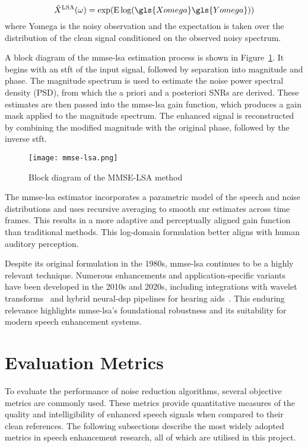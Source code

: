 \begin{equation}
    \hat{X}^{\text{LSA}}(\omega) =\exp (\mathrm{E} \log(\gls{Xomega} \gls{Yomega}))
\end{equation}
where \gls{Yomega} is the noisy observation and the expectation is taken over the distribution of the clean signal conditioned on the observed noisy spectrum.

A block diagram of the \gls{mmse-lsa} estimation process is shown in Figure~\ref{fig:mmse_lsa_block}. It begins with an \gls{stft} of the input signal, followed by separation into magnitude and phase. The magnitude spectrum is used to estimate the noise power spectral density (PSD), from which the a priori and a posteriori SNRs are derived. These estimates are then passed into the \gls{mmse-lsa} gain function, which produces a gain mask applied to the magnitude spectrum. The enhanced signal is reconstructed by combining the modified magnitude with the original phase, followed by the inverse \gls{stft}.

\begin{figure}[H]
    \centering
    \texttt{[image: mmse-lsa.png]}
    \caption{\label{fig:mmse_lsa_block} Block diagram of the MMSE-LSA method}
\end{figure}

The \gls{mmse-lsa} estimator incorporates a parametric model of the speech and noise distributions and uses recursive averaging to smooth \gls{snr} estimates across time frames. This results in a more adaptive and perceptually aligned gain function than traditional methods. This log-domain formulation better aligns with human auditory perception.

Despite its original formulation in the 1980s, \gls{mmse-lsa} continues to be a highly relevant technique. Numerous enhancements and application-specific variants have been developed in the 2010s and 2020s, including integrations with wavelet transforms~\cite{wei2016mmse} and hybrid neural-\gls{dsp} pipelines for hearing aids~\cite{sugahara2024hybrid}. This enduring relevance highlights \gls{mmse-lsa}'s foundational robustness and its suitability for modern speech enhancement systems.

\section{Evaluation Metrics}
\label{sec:evaluation_metrics}

To evaluate the performance of noise reduction algorithms, several objective metrics are commonly used. These metrics provide quantitative measures of the quality and intelligibility of enhanced speech signals when compared to their clean references. The following subsections describe the most widely adopted metrics in speech enhancement research, all of which are utilised in this project.


